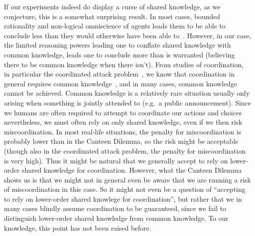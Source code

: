 \documentclass[twocolumn,a4paper,superscriptaddress,nofootinbib]{revtex4}
\begin{document}


If our experiments indeed do display a curse of shared knowledge, as we conjecture, this is a somewhat surprising result. In most cases, bounded rationality and non-logical omniscience of agents leads them to be able to conclude less than they would otherwise have been able to~\citep{fagin1995reasoning, halpern2011dealing}. However, in our case, the limited reasoning powers leading one to conflate shared knowledge with common knowledge, leads one to conclude more than is warranted (believing there to be common knowledge when there isn't). From studies of coordination, in particular the coordinated attack problem~\citep{fagin1995reasoning}, we know that coordination in general requires common knowledge~\citep{moses2016relating}, and in many cases, common knowledge cannot be achieved. Common knowledge is a relatively rare situation usually only arising when something is jointly attended to (e.g.\ a public announcement). Since we humans are often required to attempt to coordinate our actions and choices nevertheless, we must often rely on only shared knowledge, even if we then risk miscoordination. In most real-life situations, the penalty for miscoordination is probably lower than in the Canteen Dilemma, so the risk might be acceptable (though also in the coordinated attack problem, the penalty for miscoordination is very high). Thus it might be natural that we generally accept to rely on lower-order shared knowledge for coordination. However, what the Canteen Dilemma shows us is that we might not in general even be aware that we are running a risk of miscoordination in this case. So it might not even be a question of ``accepting to rely on lower-order shared knowlege for coordination'', but rather that we in many cases blindly assume coordination to be guaranteed, since we fail to distinguish lower-order shared knowledge from common knowledge. To our knowledge, this point has not been raised before. 

\end{document}
